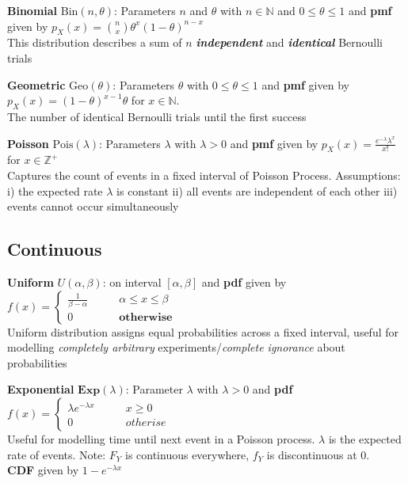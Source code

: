 \documentclass[5pt]{article}
\begin{document}
\begin{definition}
\textbf{Binomial} $\text{Bin}(n,\theta)$: Parameters $n$ and $\theta$ with $n \in \mathbb{N}$ and $0 \leq \theta \leq 1$ and \textbf{pmf} given by $p_X(x) = {n \choose x}\theta^x(1-\theta)^{n-x}$\\
This distribution describes a sum of $n$ \emph{\textbf{independent}} and \emph{\textbf{identical}} Bernoulli trials
\end{definition}

\begin{definition}
\textbf{Geometric} $\text{Geo}(\theta)$: Parameters $\theta$ with $0 \leq \theta \leq 1$ and \textbf{pmf} given by $p_X(x) = (1-\theta)^{x-1} \theta$ for $x \in \mathbb{N}.$\\
The number of identical Bernoulli trials until the first success
\end{definition}

\begin{definition} 
\textbf{Poisson} $\text{Pois}(\lambda)$: Parameters $\lambda$ with $\lambda > 0$ and \textbf{pmf} given by $p_X(x) = \frac{e^{-\lambda}\lambda^x}{x!}$ for $x \in \mathbb{Z}^+$\\
Captures the count of events in a fixed interval of Poisson Process. Assumptions: i) the expected rate $\lambda$ is constant ii) all events are independent of each other iii) events cannot occur simultaneously
\end{definition}

\subsection{Continuous}
\begin{definition}
\textbf{Uniform} $U(\alpha,\beta)$: on interval $[\alpha,\beta]$ and \textbf{pdf} given by $f(x) = \begin{cases}
\frac{1}{\beta - \alpha} \qquad & \alpha \leq x \leq \beta\\
0 &\textbf{otherwise}
\end{cases}$\\
Uniform distribution assigns equal probabilities across a fixed interval, useful for modelling \emph{completely arbitrary} experiments/\emph{complete ignorance} about probabilities
\end{definition}

\begin{definition}
\textbf{Exponential} $\textbf{Exp}(\lambda)$: Parameter $\lambda$ with $\lambda > 0$ and \textbf{pdf} $f(x) = \begin{cases}
\lambda e^{-\lambda x} \qquad & x \geq 0\\
0 &otherise
\end{cases}$\\
Useful for modelling time until next event in a Poisson process. $\lambda$ is the expected rate of events. Note: $F_Y$ is continuous everywhere, $f_Y$ is discontinuous at 0.\\
\textbf{CDF} given by $1-e^{-\lambda  x}$
\end{definition}
\end{document}
